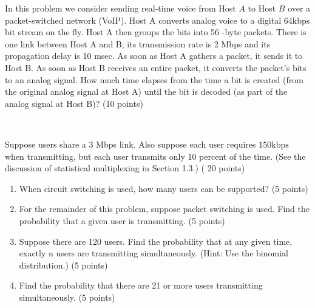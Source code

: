 \begin{exercise}[]{In this problem we consider sending real-time voice from Host $A$ to Host $B$ over a packet-switched network (VoIP). Host A converts analog voice to a digital $64 \mathrm{kbps}$ bit stream on the fly. Host A then groups the bits into 56 -byte packets. There is one link between Host A and B; its transmission rate is 2 Mbps and its propagation delay is 10 msec. As soon as Host A gathers a packet, it sends it to Host $\mathrm{B}$. As soon as Host $\mathrm{B}$ receives an entire packet, it converts the packet's bits to an analog signal. How much time elapses from the time a bit is created (from the original analog signal at Host A) until the bit is decoded (as part of the analog signal at Host B)? (10 points)}
  \begin{solution}
  \par{~}
  \end{solution}
  \label{ex1}
\end{exercise}



\begin{exercise}[]{Suppose users share a 3 Mbps link. Also suppose each user requires $150 \mathrm{kbps}$ when transmitting, but each user transmits only 10 percent of the time. (See the discussion of statistical multiplexing in Section 1.3.) ( 20 points)
    \begin{enumerate}
        \item When circuit switching is used, how many users can be supported? (5 points)
        \item For the remainder of this problem, suppose packet switching is used. Find the probability that a given user is transmitting. (5 points)
        \item Suppose there are 120 users. Find the probability that at any given time, exactly n users are transmitting simultaneously. (Hint: Use the binomial distribution.) (5 points)
        \item Find the probability that there are 21 or more users transmitting simultaneously. (5 points)
    \end{enumerate}
    }
  \begin{solution}
  \par{~}
  \end{solution}
  \label{ex2}
\end{exercise}

